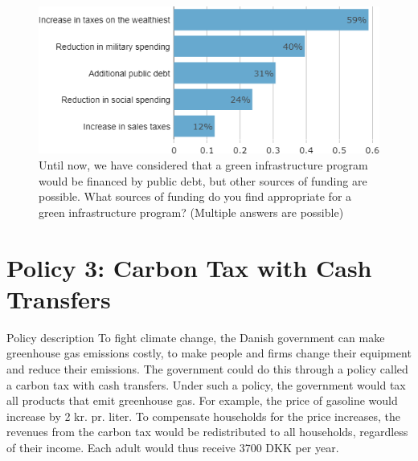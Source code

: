 \documentclass[aspectratio=169,9pt,dvipsnames]{beamer}
\begin{document}
\begin{frame}{}%
\begin{figure}[h!]
\centering
\caption{Until now, we have considered that a green infrastructure program would be financed by public debt, but other sources of funding are possible.
What sources of funding do you find appropriate for a green infrastructure program? (Multiple answers are possible)}
\includegraphics[width=.8\textwidth]{../figures/DK/investments_funding_DK.png}
\end{figure}
\end{frame}

\section{Policy 3: Carbon Tax with Cash Transfers}

\begin{frame}{Policy description}%
To fight climate change, the Danish government can make greenhouse gas emissions costly, to make people and firms change their equipment and reduce their emissions. The government could do this through a policy called a carbon tax with cash transfers. Under such a policy, the government would tax all products that emit greenhouse gas. For example, the price of gasoline would increase by 2 kr. pr. liter. To compensate households for the price increases, the revenues from the carbon tax would be redistributed to all households, regardless of their income. Each adult would thus receive 3700 DKK per year.
\end{frame}
\end{document}
